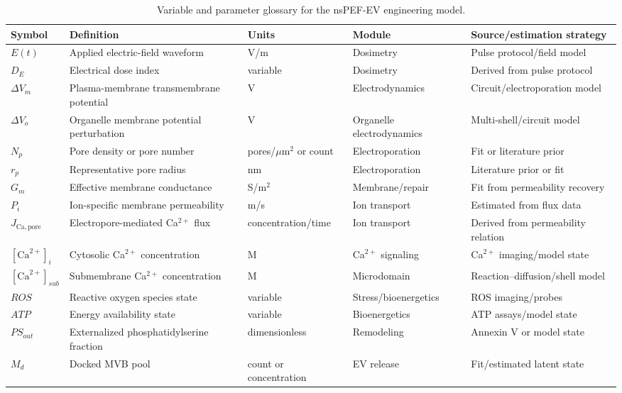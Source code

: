 \documentclass[Afour,sagev,times]{sagej}
\begin{document}
\begin{table}[t]
\footnotesize\sf
\centering
\caption{Variable and parameter glossary for the nsPEF-EV engineering model.\label{T_A17_glossary}}
\begin{tabular}{p{2.5cm} p{5.0cm} p{2.1cm} p{2.7cm} p{3.2cm}}
\toprule
\textbf{Symbol} & \textbf{Definition} & \textbf{Units} & \textbf{Module} & \textbf{Source/estimation strategy} \\
\midrule
$E(t)$ & Applied electric-field waveform & V/m & Dosimetry & Pulse protocol/field model \\
$D_E$ & Electrical dose index & variable & Dosimetry & Derived from pulse protocol \\
$\Delta V_m$ & Plasma-membrane transmembrane potential & V & Electrodynamics & Circuit/electroporation model \\
$\Delta V_o$ & Organelle membrane potential perturbation & V & Organelle electrodynamics & Multi-shell/circuit model \\
$N_p$ & Pore density or pore number & pores/$\mu$m$^2$ or count & Electroporation & Fit or literature prior \\
$r_p$ & Representative pore radius & nm & Electroporation & Literature prior or fit \\
$G_m$ & Effective membrane conductance & S/m$^2$ & Membrane/repair & Fit from permeability recovery \\
$P_i$ & Ion-specific membrane permeability & m/s & Ion transport & Estimated from flux data \\
$J_{\mathrm{Ca,pore}}$ & Electropore-mediated Ca$^{2+}$ flux & concentration/time & Ion transport & Derived from permeability relation \\
$[\mathrm{Ca}^{2+}]_i$ & Cytosolic Ca$^{2+}$ concentration & M & Ca$^{2+}$ signaling & Ca$^{2+}$ imaging/model state \\
$[\mathrm{Ca}^{2+}]_{sub}$ & Submembrane Ca$^{2+}$ concentration & M & Microdomain & Reaction--diffusion/shell model \\
$ROS$ & Reactive oxygen species state & variable & Stress/bioenergetics & ROS imaging/probes \\
$ATP$ & Energy availability state & variable & Bioenergetics & ATP assays/model state \\
$PS_{out}$ & Externalized phosphatidylserine fraction & dimensionless & Remodeling & Annexin V or model state \\
$M_d$ & Docked MVB pool & count or concentration & EV release & Fit/estimated latent state \\

\end{tabular}
\end{table}
\end{document}
